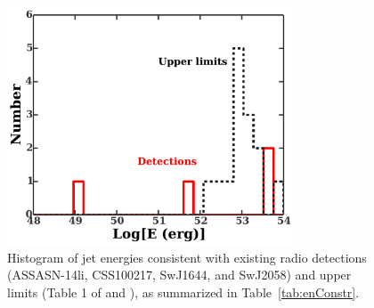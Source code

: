 \documentclass[usenatbib,fleqn]{mnras}
\begin{document}
\begin{figure}
\includegraphics[width=8.5cm]{hist.pdf}
\caption{\label{fig:hist} Histogram of jet energies consistent with
  existing radio detections (ASSASN-14li, CSS100217, SwJ1644, and
  SwJ2058) and upper limits (Table 1 of \citealt{Mimica+2015} and
  \citealt{Arcavi+2014}), as summarized in Table~\ref{tab:enConstr}.}
\end{figure}
\end{document}
